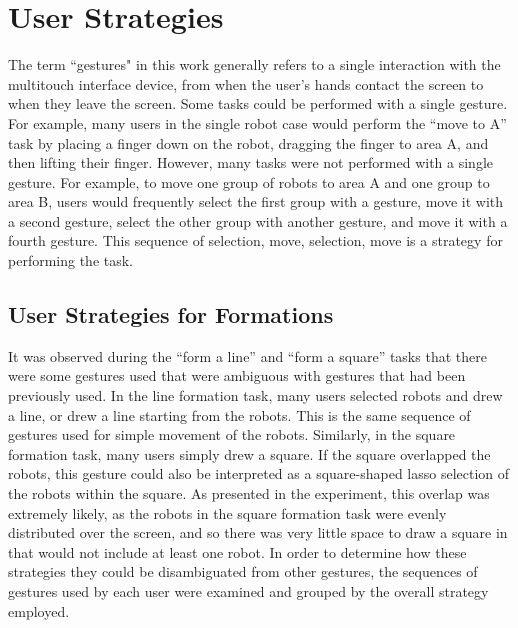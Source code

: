 \section{User Strategies}

The term ``gestures" in this work generally refers to a single interaction with the multitouch interface device, from when the user's hands contact the screen to when they leave the screen. 
Some tasks could be performed with a single gesture. 
For example, many users in the single robot case would perform the ``move to A'' task by placing a finger down on the robot, dragging the finger to area A, and then lifting their finger. 
However, many tasks were not performed with a single gesture. 
For example, to move one group of robots to area A and one group to area B, users would frequently select the first group with a gesture, move it with a second gesture, select the other group with another gesture, and move it with a fourth gesture. 
This sequence of selection, move, selection, move is a strategy for performing the task. 

\subsection{User Strategies for Formations}
It was observed during the ``form a line'' and ``form a square'' tasks that there were some gestures used that were ambiguous with gestures that had been previously used. 
In the line formation task, many users selected robots and drew a line, or drew a line starting from the robots. 
This is the same sequence of gestures used for simple movement of the robots.
Similarly, in the square formation task, many users simply drew a square. 
If the square overlapped the robots, this gesture could also be interpreted as a square-shaped lasso selection of the robots within the square. 
As presented in the experiment, this overlap was extremely likely, as the robots in the square formation task were evenly distributed over the screen, and so there was very little space to draw a square in that would not include at least one robot. 
In order to determine how these strategies they could be disambiguated from other gestures, the sequences of gestures used by each user were examined and grouped by the overall strategy employed. 

